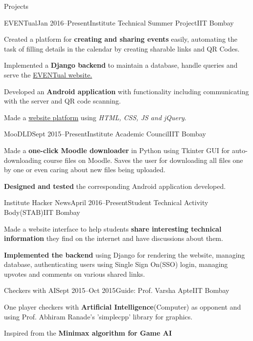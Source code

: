 \documentclass{resume_ssl}
\begin{document}
\begin{Section}{Projects}
\begin{Subsection}{EVENTual}{Jan 2016--Present}{Institute Technical Summer Project}{IIT Bombay}{
\item {Created a platform for \textbf{creating and sharing events} easily, automating the task of filling details in the calendar by creating sharable links and QR Codes.}
\item {Implemented a \textbf{Django backend} to maintain a database, handle queries and serve the
\href{http://www.eventual.co.in}{EVENTual website.}}
\item {Developed an \textbf{Android application} with functionality including communicating with the server and QR code scanning.}
\item {Made a \href{http://www.eventual.co.in}{website platform} using \textit{HTML, CSS, JS and jQuery}.}
}
\end{Subsection}

\begin{Subsection}{MooDLD}{Sept 2015--Present}{Institute Academic Council}{IIT Bombay}{
\item {Made a \textbf{one-click Moodle downloader} in Python using Tkinter GUI for auto-downloading course files on Moodle. Saves the user for downloading all files one by one or even caring about new files being uploaded.}
\item {\textbf{Designed and tested} the corresponding Android application developed.}
}
\end{Subsection}

\begin{Subsection}{Institute Hacker News}{April 2016--Present}{Student Technical Activity Body(STAB)}{IIT Bombay}{
\item {Made a website interface to help students \textbf{share interesting technical information} they find on the internet and have discussions about them.}
\item {\textbf{Implemented the backend} using Django for rendering the website, managing database, authenticating users using Single Sign On(SSO) login, managing upvotes and comments on various shared links.}
}
\end{Subsection}

\begin{Subsection}{Checkers with AI}{Sept 2015--Oct 2015}{Guide: Prof. Varsha Apte}{IIT Bombay}{
\item {One player checkers with \textbf{Artificial Intelligence}(Computer) as opponent and using Prof. Abhiram Ranade's 'simplecpp' library for graphics.}
\item {Inspired from the \textbf{Minimax algorithm for Game AI}}
}
\end{Subsection}

\end{Section}
\end{document}
